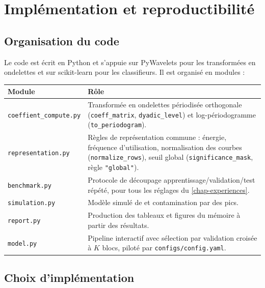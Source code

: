 \chapter{Implémentation et reproductibilité}\label{chap-implementation}

\section{Organisation du code}

Le code est écrit en Python et s'appuie sur PyWavelets \citep{lee2019pywavelets} pour les transformées en ondelettes et sur scikit-learn \citep{pedregosa2011scikit} pour les classifieurs. Il est organisé en modules :

\begin{center}
\small
\begin{tabular}{@{}p{4.6cm}p{9.6cm}@{}}
\toprule
Module & Rôle \\
\midrule
\texttt{coeffient\_compute.py} & Transformée en ondelettes périodisée orthogonale (\texttt{coeff\_matrix}, \texttt{dyadic\_level}) et log-périodogramme (\texttt{to\_periodogram}). \\
\texttt{representation.py} & Règles de représentation commune : énergie, fréquence d'utilisation, normalisation des courbes (\texttt{normalize\_rows}), seuil global (\texttt{significance\_mask}, règle \texttt{"global"}). \\
\texttt{benchmark.py} & Protocole de découpage apprentissage/validation/test répété, pour tous les réglages du \cref{chap-experiences}. \\
\texttt{simulation.py} & Modèle simulé de \citet[section 3.2]{berlinet2008functional} et contamination par des pics. \\
\texttt{report.py} & Production des tableaux et figures du mémoire à partir des résultats. \\
\texttt{model.py} & Pipeline interactif avec sélection par validation croisée à $K$ blocs, piloté par \texttt{configs/config.yaml}. \\
\bottomrule
\end{tabular}
\end{center}

\section{Choix d'implémentation}

